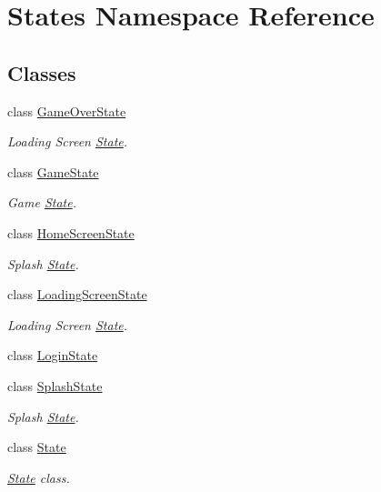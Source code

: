 \hypertarget{namespace_states}{}\section{States Namespace Reference}
\label{namespace_states}
\subsection*{Classes}
\begin{DoxyCompactItemize}
\item 
class \mbox{\hyperlink{class_states_1_1_game_over_state}{Game\+Over\+State}}
\begin{DoxyCompactList}\small\item\em Loading Screen \mbox{\hyperlink{class_states_1_1_state}{State}}. \end{DoxyCompactList}\item 
class \mbox{\hyperlink{class_states_1_1_game_state}{Game\+State}}
\begin{DoxyCompactList}\small\item\em Game \mbox{\hyperlink{class_states_1_1_state}{State}}. \end{DoxyCompactList}\item 
class \mbox{\hyperlink{class_states_1_1_home_screen_state}{Home\+Screen\+State}}
\begin{DoxyCompactList}\small\item\em Splash \mbox{\hyperlink{class_states_1_1_state}{State}}. \end{DoxyCompactList}\item 
class \mbox{\hyperlink{class_states_1_1_loading_screen_state}{Loading\+Screen\+State}}
\begin{DoxyCompactList}\small\item\em Loading Screen \mbox{\hyperlink{class_states_1_1_state}{State}}. \end{DoxyCompactList}\item 
class \mbox{\hyperlink{class_states_1_1_login_state}{Login\+State}}
\item 
class \mbox{\hyperlink{class_states_1_1_splash_state}{Splash\+State}}
\begin{DoxyCompactList}\small\item\em Splash \mbox{\hyperlink{class_states_1_1_state}{State}}. \end{DoxyCompactList}\item 
class \mbox{\hyperlink{class_states_1_1_state}{State}}
\begin{DoxyCompactList}\small\item\em \mbox{\hyperlink{class_states_1_1_state}{State}} class. \end{DoxyCompactList}\end{DoxyCompactItemize}


